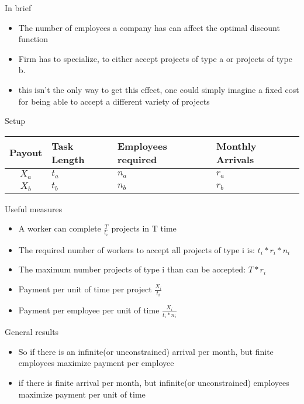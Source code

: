 \documentclass{beamer}
\numberwithin{equation}{section}
\begin{document}
\begin{frame}{In brief}
\begin{itemize}
\item The number of employees a company has can affect the optimal discount function
\item Firm has to specialize, to either accept projects of type a or projects of type b.
\item this isn't the only way to get this effect, one could simply imagine a fixed cost for being able to accept a different variety of projects 
\end{itemize}
\end{frame}

\begin{frame}{Setup}
\begin{table}[]
\begin{tabular}{|c|l|l|l|}
\hline
Payout     & Task Length     & Employees required   & Monthly Arrivals \\ \hline
$X_a$ & $t_a$ & $n_a$ & $r_a$                 \\ \hline
$X_b$ & $t_b$ & $n_b$ & $r_b$                 \\ \hline
\end{tabular}
\end{table}
\end{frame}

\begin{frame}{Useful measures}
\begin{itemize}
\item A worker can complete $\frac{T}{t_i}$ projects in T time
\item The required number of workers to accept all projects of type i is: $t_i*r_i*n_i$
\item The maximum number projects of type i than can be accepted: $T*r_i$
\item Payment per unit of time per project $\frac{X_i}{t_i}$
\item Payment per employee per unit of time $\frac{X_i}{t_i*n_i}$
\end{itemize}
\end{frame}

\begin{frame}{General results}
\begin{itemize}
\item So if there is an infinite(or unconstrained) arrival per month, but finite employees maximize payment per employee
\item if there is finite arrival per month, but infinite(or unconstrained) employees maximize payment per unit of time
\end{itemize}
\end{frame}
\end{document}
